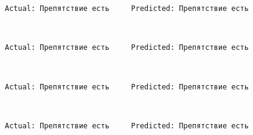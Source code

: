 \documentclass[11pt]{article}
\begin{document}
    \begin{Verbatim}[commandchars=\\\{\}]
Actual: Препятствие есть     Predicted: Препятствие есть

    \end{Verbatim}

    \begin{center}
    \end{center}
    { \hspace*{\fill} \\}
    
    \begin{Verbatim}[commandchars=\\\{\}]
Actual: Препятствие есть     Predicted: Препятствие есть

    \end{Verbatim}

    \begin{center}
    \end{center}
    { \hspace*{\fill} \\}
    
    \begin{Verbatim}[commandchars=\\\{\}]
Actual: Препятствие есть     Predicted: Препятствие есть

    \end{Verbatim}

    \begin{center}
    \end{center}
    { \hspace*{\fill} \\}
    
    \begin{Verbatim}[commandchars=\\\{\}]
Actual: Препятствие есть     Predicted: Препятствие есть

    \end{Verbatim}

    \begin{center}
    \end{center}
    { \hspace*{\fill} \\}
    
\end{document}
